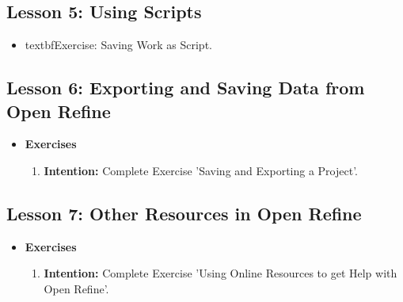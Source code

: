\documentclass{article}
\begin{document}
\subsection{Lesson 5: Using Scripts}

\begin{itemize}
    \item{textbf{Exercise: Saving Work as Script.}}
    
\end{itemize}



\subsection{Lesson 6: Exporting and Saving Data from Open Refine}

\begin{itemize}
\item{\textbf{Exercises}}

\begin{enumerate}

\item{\textbf{Intention:} Complete Exercise 'Saving and Exporting a Project'.}


\end{enumerate}
\end{itemize}




\subsection{Lesson 7: Other Resources in Open Refine}

\begin{itemize}
\item{\textbf{Exercises}}

\begin{enumerate}

\item{\textbf{Intention:} Complete Exercise 'Using Online Resources to get Help with Open Refine'.}


\end{enumerate}
\end{itemize}
\end{document}
